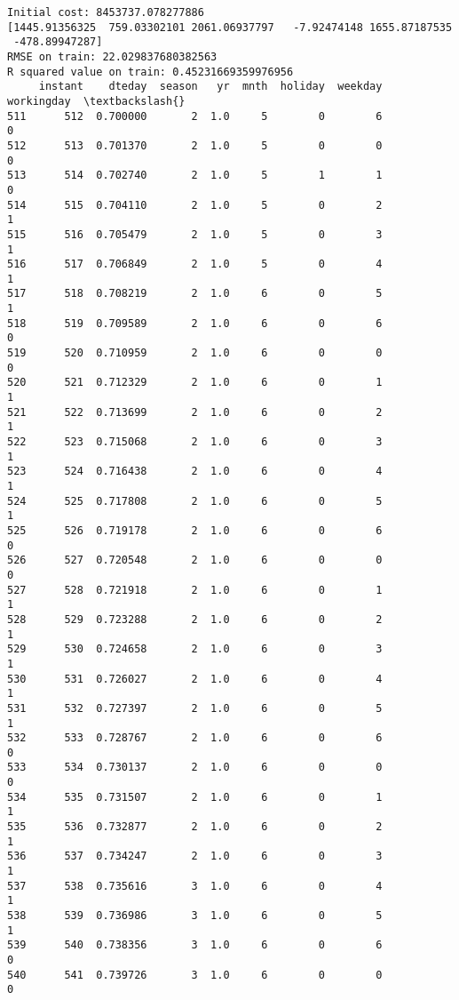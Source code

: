 \documentclass[11pt]{article}
\begin{document}
    \begin{Verbatim}[commandchars=\\\{\}]
Initial cost: 8453737.078277886
[1445.91356325  759.03302101 2061.06937797   -7.92474148 1655.87187535
 -478.89947287]
RMSE on train: 22.029837680382563
R squared value on train: 0.45231669359976956
     instant    dteday  season   yr  mnth  holiday  weekday  workingday  \textbackslash{}
511      512  0.700000       2  1.0     5        0        6           0   
512      513  0.701370       2  1.0     5        0        0           0   
513      514  0.702740       2  1.0     5        1        1           0   
514      515  0.704110       2  1.0     5        0        2           1   
515      516  0.705479       2  1.0     5        0        3           1   
516      517  0.706849       2  1.0     5        0        4           1   
517      518  0.708219       2  1.0     6        0        5           1   
518      519  0.709589       2  1.0     6        0        6           0   
519      520  0.710959       2  1.0     6        0        0           0   
520      521  0.712329       2  1.0     6        0        1           1   
521      522  0.713699       2  1.0     6        0        2           1   
522      523  0.715068       2  1.0     6        0        3           1   
523      524  0.716438       2  1.0     6        0        4           1   
524      525  0.717808       2  1.0     6        0        5           1   
525      526  0.719178       2  1.0     6        0        6           0   
526      527  0.720548       2  1.0     6        0        0           0   
527      528  0.721918       2  1.0     6        0        1           1   
528      529  0.723288       2  1.0     6        0        2           1   
529      530  0.724658       2  1.0     6        0        3           1   
530      531  0.726027       2  1.0     6        0        4           1   
531      532  0.727397       2  1.0     6        0        5           1   
532      533  0.728767       2  1.0     6        0        6           0   
533      534  0.730137       2  1.0     6        0        0           0   
534      535  0.731507       2  1.0     6        0        1           1   
535      536  0.732877       2  1.0     6        0        2           1   
536      537  0.734247       2  1.0     6        0        3           1   
537      538  0.735616       3  1.0     6        0        4           1   
538      539  0.736986       3  1.0     6        0        5           1   
539      540  0.738356       3  1.0     6        0        6           0   
540      541  0.739726       3  1.0     6        0        0           0   

\end{Verbatim}
\end{document}
